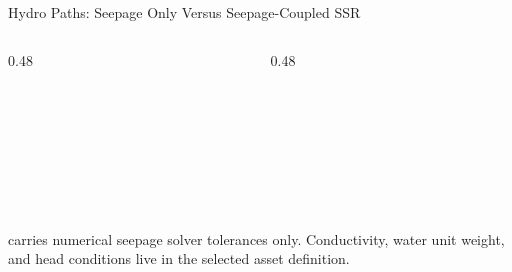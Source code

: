 \documentclass[aspectratio=169,10pt]{beamer}
\begin{document}
\begin{frame}{Hydro Paths: Seepage Only Versus Seepage-Coupled SSR}
\small
\begin{columns}[T,totalwidth=\textwidth]
\begin{column}{0.48\textwidth}
\begin{pseudobox}
\code{[problem]}\\
\\
\\
\\
\code{[seepage]}\\
\end{pseudobox}
\end{column}
\begin{column}{0.48\textwidth}
\begin{pseudobox}
\code{[problem]}\\
\\
\\
\\
\\
\code{[continuation]}\\
\end{pseudobox}
\end{column}
\end{columns}
\vspace{0.12cm}
\begin{callout}
\code{[seepage]} carries numerical seepage solver tolerances only. Conductivity, water unit weight, and head conditions live in the selected asset definition.
\end{callout}
\end{frame}
\end{document}
